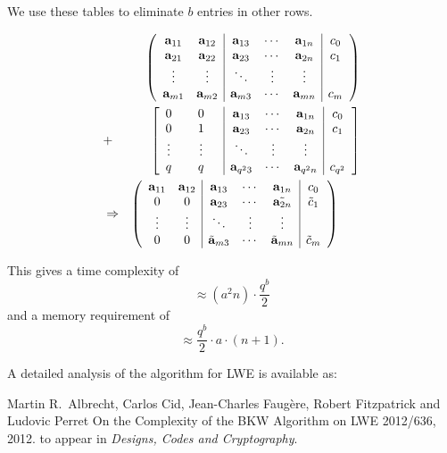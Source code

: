 \documentclass[10pt]{beamer}
\begin{document}
\begin{frame}[allowframebreaks]
\framebreak

We use these tables to eliminate $b$ entries in other rows.

\begin{eqnarray*}
& & \left(
\begin{array}{cc|ccc|c}
\bold{a}_{11} & \bold{a}_{12} & \bold{a}_{13} & \cdots & \bold{a}_{1n} & c_0\\
\bold{a}_{21} & \bold{a}_{22} & \bold{a}_{23} & \cdots & \bold{a}_{2n} & c_1\\
\vdots & \vdots & \ddots & \vdots & \vdots\\
\bold{a}_{m1} & \bold{a}_{m2} & \bold{a}_{m3} & \cdots & \bold{a}_{mn} & c_{m}
\end{array}
\right)\\
&+& \left[
\begin{array}{cc|ccc|c}
0 \hspace{1.1em} & 0 \hspace{1.1em} & \bold{a}_{13} & \cdots & \bold{a}_{1n} & c_0\\
0 \hspace{1.1em} & 1 \hspace{1.1em} & \bold{a}_{23} & \cdots & \bold{a}_{2n} & c_1\\
\vdots \hspace{1.1em} & \vdots \hspace{1.1em} & \ddots & \vdots & \vdots\\
q \hspace{1.1em} & q \hspace{1.1em} & \bold{a}_{q^23} & \cdots & \bold{a}_{q^2n} & c_{q^2}
\end{array}\right]\\
&\Rightarrow& \left(
\begin{array}{cc|ccc|c}
\bold{a}_{11} & \bold{a}_{12} & \bold{a}_{13} & \cdots & \bold{a}_{1n} & c_0\\
0 & 0 & \bold{a}_{23} & \cdots & \tilde{\bold{a}_{2n}} & \tilde{c}_1\\
\vdots & \vdots & \ddots & \vdots & \vdots\\
0 & 0 & \tilde{\bold{a}}_{m3} & \cdots & \tilde{\bold{a}}_{mn} & \tilde{c}_{m}
\end{array}
\right)\phantom{\Longrightarrow}
\end{eqnarray*}

\framebreak

This gives a time complexity of $$\approx (a^2n)\cdot\frac{q^b}{2}$$ and a memory requirement of $$\approx\frac{q^b}{2}\cdot a\cdot(n+1).$$

\vspace{1em}

A detailed analysis of the algorithm for LWE is available as:

\begin{thebibliography}{foobar}
Martin R.\ Albrecht, Carlos Cid, Jean-Charles Faugère, Robert Fitzpatrick and Ludovic Perret
\newblock On the Complexity of the BKW Algorithm on LWE
 2012/636, 2012.
\newblock to appear in {\em Designs, Codes and Cryptography}.
\end{thebibliography}
\end{frame}
\end{document}

